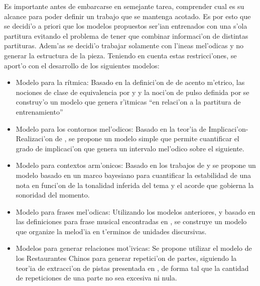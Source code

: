 Es importante antes de embarcarse en semejante tarea, comprender cual es su alcance para poder definir un trabajo que se mantenga 
acotado. Es por esto que se decidi'o a priori que los modelos propuestos ser'ian entrenados con una s'ola partitura evitando
el problema de tener que combinar informaci'on de distintas partituras. Adem'as se decidi'o trabajar solamente con l'ineas 
mel'odicas y no generar la estructura de la pieza.
Teniendo en cuenta estas restricci'ones, se aport'o con el desarrollo de los siguientes modelos:


\begin{itemize}
 \item Modelo para la r\'itmica: Basado en la definici'on de \cite{LerdahlJackendoff83} de acento m'etrico, las nociones de 
 clase de equivalencia por \cite{Benjamin84} y \cite{clarke1987categorical} y la noci'on de pulso definida por \cite{snyder2001}
 se construy'o un modelo que genera r'itmicas ``en relaci'on a la partitura de entrenamiento''

 \item Modelo para los contornos mel'odicos: Basado en la teor'ia de Implicaci'on-Realizaci'on de \cite{Narmour90}, 
 se propone un modelo simple que permite cuantificar el grado de implicaci'on que genera un intervalo mel'odico sobre el siguiente.

 \item Modelo para contextos arm'onicos: Basado en los trabajos de \cite{Krumhansl90} y \cite{Lerdahl2001} se propone un 
 modelo basado en un marco bayesiano para cuantificar la estabilidad de una nota en funci'on de la tonalidad inferida del tema y 
 el acorde que gobierna la sonoridad del momento.

 \item Modelo para frases mel'odicas: Utilizando los modelos anteriores, y basado en las definiciones para frase musical encontradas
 en \cite{rothstein1989phrase}, se construye un modelo que organize la melod'ia en t'erminos de unidades discursivas.

 \item Modelos para generar relaciones mot'ivicas: Se propone utilizar el modelo de los Restaurantes Chinos \citep{Teh2007} 
 para generar repetici'on de partes, siguiendo la teor'ia de extracci'on de pistas presentada en \cite{Deliege90}, de forma tal 
 que la cantidad de repeticiones de una parte no sea excesiva ni nula.

\end{itemize}

